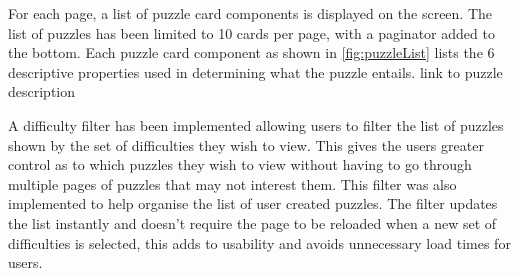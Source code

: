 \documentclass{l4proj}
\begin{document}
For each page, a list of puzzle card components is displayed on the screen. The list of puzzles has been limited to 10 cards per page, with a paginator added to the bottom. Each puzzle card component as shown in \ref{fig:puzzleList} lists the 6 descriptive properties used in determining what the puzzle entails. 
link to puzzle description

A difficulty filter has been implemented allowing users to filter the list of puzzles shown by the set of difficulties they wish to view. This gives the users greater control as to which puzzles they wish to view without having to go through multiple pages of puzzles that may not interest them. This filter was also implemented to help organise the list of user created puzzles. The filter updates the list instantly and doesn't require the page to be reloaded when a new set of difficulties is selected, this adds to usability and avoids unnecessary load times for users.


\end{document}
